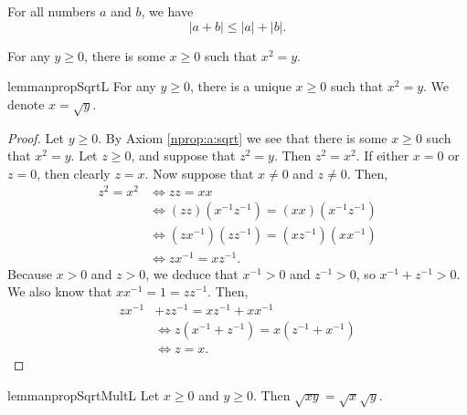 \begin{theorem}
	\label{nprop:t:triangle}
	For all numbers $a$ and $b$, we have
	$$
		|a + b| \leq |a| + |b|.
	$$
\end{theorem}

\begin{axiom} %
	\label{nprop:a:sqrt}
	For any $y \geq 0$, there is some $x \geq 0$ such that $x^2 = y$.
\end{axiom}

\Newpage
\begin{restatable}{lemma}{npropSqrtL} %
	\label{nprop:l:sqrt}
	For any $y \geq 0$, there is a unique $x \geq 0$ such that $x^2 = y$. We denote $x = \sqrt{y}$.
\end{restatable}

\begin{proof}
	Let $y \geq 0$. By Axiom \ref{nprop:a:sqrt} we see that there is some $x \geq 0$ such that $x^2 = y$. Let $z \geq 0$, and suppose that $z^2 = y$. Then $z^2 = x^2$. If either $x = 0$ or $z = 0$, then clearly $z = x$. Now suppose that $x \neq 0$ and $z \neq 0$. Then,
	\begin{align*}
		z^2 = x^2 & \iff z z = x x                                   \\
		          & \iff (z z)(x^{-1} z^{-1}) = (x x)(x^{-1} z^{-1}) \\
		          & \iff (z x^{-1})(z z^{-1}) = (x z^{-1})(x x^{-1}) \\
		          & \iff z x^{-1} = x z^{-1}.
	\end{align*}
	Because $x > 0$ and $z > 0$, we deduce that $x^{-1} > 0$ and $z^{-1} > 0$, so $x^{-1} + z^{-1} > 0$. We also know that $x x^{-1} = 1 = z z^{-1}$. Then,
	\begin{align*}
		z x^{-1} & + z z^{-1} = x z^{-1} + x x^{-1}               \\
		         & \iff z (x^{-1} + z^{-1}) = x (z^{-1} + x^{-1}) \\
		         & \iff z = x.
	\end{align*}
\end{proof}


\Newpage
\npropSqrtL*
\begin{restatable}{lemma}{npropSqrtMultL} %
	\label{nprop:l:sqrt_mult}
	Let $x \geq 0$ and $y \geq 0$. Then $\sqrt{x y} = \sqrt{x} \sqrt{y}$.
\end{restatable}

